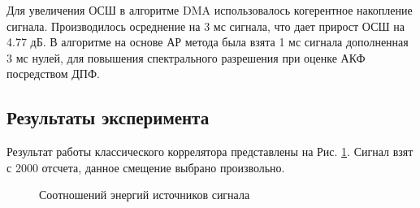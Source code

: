Для увеличения ОСШ в алгоритме DMA использовалось когерентное накопление сигнала. Производилось осреднение на 3 мс сигнала, что дает прирост ОСШ на 4.77 дБ.
В алгоритме на основе АР метода была взята 1 мс сигнала дополненная 3 мс нулей, для повышения спектрального разрешения при оценке АКФ посредством ДПФ.

\subsection{Результаты эксперимента}

Результат работы классического коррелятора представлены на Рис. \ref{pic:16mhz_sats_all}. Сигнал взят с 2000 отсчета, данное смещение выбрано произвольно.
\begin{figure}[h]
\center{}
	\caption{Соотношений энергий источников сигнала}
	\label{pic:16mhz_sats_all}
\end{figure}

